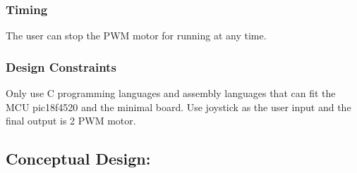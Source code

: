 \documentclass[MTRX3700report.tex]{subfiles}
\begin{document}
\subsubsection{Timing}
The user can stop the PWM motor for running at any time.

\subsubsection{Design Constraints}
Only use C programming languages and assembly languages that can fit the MCU pic18f4520 and the minimal board. Use joystick as the user input and the final output is 2 PWM motor. 

\subsection{Conceptual Design:}
\end{document}
